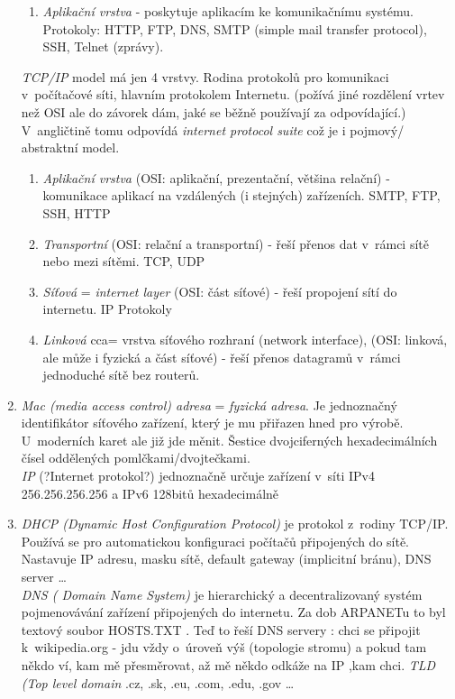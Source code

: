 \documentclass[12pt]{article}
\begin{document}
\begin{enumerate}
\begin{enumerate}
\item \emph{Aplikační vrstva} - poskytuje aplikacím ke komunikačnímu systému. Protokoly: HTTP, FTP, DNS, SMTP (simple mail transfer protocol), SSH, Telnet (zprávy).
\end{enumerate}
\emph{TCP/IP} model má jen 4 vrstvy. Rodina protokolů pro komunikaci v~počítačové síti, hlavním protokolem Internetu. (požívá jiné rozdělení vrtev než OSI ale do závorek dám, jaké se běžně používají za odpovídající.) V~angličtině tomu odpovídá \emph{internet protocol suite} což je i pojmový/ abstraktní model.
\begin{enumerate}
\item \emph{Aplikační vrstva} (OSI: aplikační, prezentační, většina relační) - komunikace aplikací na vzdálených (i stejných) zařízeních. SMTP, FTP, SSH, HTTP
\item \emph{Transportní} (OSI: relační a transportní) - řeší přenos dat v~rámci sítě nebo mezi sítěmi. TCP, UDP
\item \emph{Síťová} = \emph{internet layer} (OSI: část síťové) - řeší propojení sítí do internetu. IP Protokoly
\item \emph{Linková} cca= vrstva síťového rozhraní (network interface), (OSI: linková, ale může i fyzická a část síťové) - řeší přenos datagramů v~rámci jednoduché sítě bez routerů.
\end{enumerate}
\item \emph{Mac (media access control) adresa} = \emph{fyzická adresa}. Je jednoznačný identifikátor síťového zařízení, který je mu přiřazen hned pro výrobě. U~moderních karet ale již jde měnit. Šestice dvojciferných hexadecimálních čísel oddělených pomlčkami/dvojtečkami.\\
\emph{IP} (?Internet protokol?) jednoznačně určuje zařízení v~síti IPv4 256.256.256.256 a IPv6 128bitů hexadecimálně
\item \emph{DHCP (Dynamic Host Configuration Protocol)} je protokol z~rodiny TCP/IP. Používá se pro automatickou konfiguraci počítačů připojených do sítě. Nastavuje IP adresu, masku sítě,  default gateway (implicitní bránu), DNS server \dots \\
\emph{DNS ( Domain Name System)} je hierarchický a decentralizovaný systém pojmenovávání zařízení připojených do internetu. Za dob ARPANETu  to byl textový soubor HOSTS.TXT . Teď to řeší DNS servery : chci se připojit k~wikipedia.org - jdu vždy o~úroveň výš (topologie stromu) a pokud tam někdo ví, kam mě přesměrovat, až mě někdo odkáže na IP ,kam chci. \emph{TLD (Top level domain} .cz, .sk, .eu, .com, .edu, .gov  \dots\\

\end{enumerate}
\end{document}
